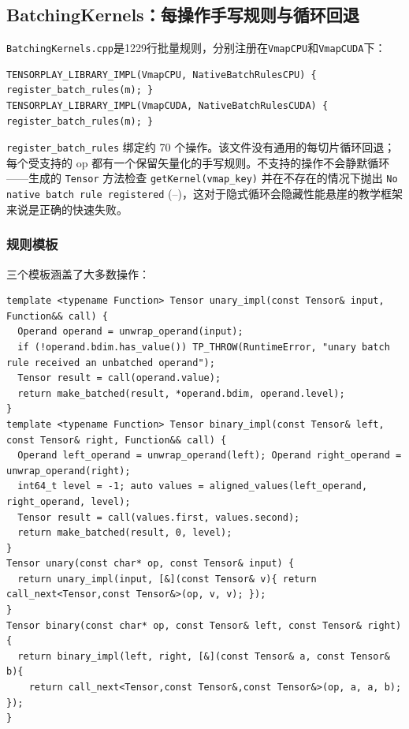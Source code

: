 \subsection{BatchingKernels：每操作手写规则与循环回退}
\label{sec:batchingkernels}

\texttt{BatchingKernels.cpp}是1229行批量规则，分别注册在\texttt{VmapCPU}和\texttt{VmapCUDA}下：

\begin{lstlisting}[caption={dual registration.}, label=lst:batchreg]
TENSORPLAY_LIBRARY_IMPL(VmapCPU, NativeBatchRulesCPU) { register_batch_rules(m); }
TENSORPLAY_LIBRARY_IMPL(VmapCUDA, NativeBatchRulesCUDA) { register_batch_rules(m); }
\end{lstlisting}

\texttt{register\_batch\_rules} 绑定约 70 个操作。该文件没有通用的每切片循环回退；每个受支持的 \ac{op} 都有一个保留矢量化的手写规则。不支持的操作不会静默循环——生成的 \texttt{Tensor} 方法检查 \texttt{getKernel(vmap\_key)} 并在不存在的情况下抛出 \texttt{No native batch rule registered} (--)，这对于隐式循环会隐藏性能悬崖的教学框架来说是正确的快速失败。

\subsubsection{规则模板}

三个模板涵盖了大多数操作：

\begin{lstlisting}[caption={unary / binary templates.}, label=lst:templates]
template <typename Function> Tensor unary_impl(const Tensor& input, Function&& call) {
  Operand operand = unwrap_operand(input);
  if (!operand.bdim.has_value()) TP_THROW(RuntimeError, "unary batch rule received an unbatched operand");
  Tensor result = call(operand.value);
  return make_batched(result, *operand.bdim, operand.level);
}
template <typename Function> Tensor binary_impl(const Tensor& left, const Tensor& right, Function&& call) {
  Operand left_operand = unwrap_operand(left); Operand right_operand = unwrap_operand(right);
  int64_t level = -1; auto values = aligned_values(left_operand, right_operand, level);
  Tensor result = call(values.first, values.second);
  return make_batched(result, 0, level);
}
Tensor unary(const char* op, const Tensor& input) {
  return unary_impl(input, [&](const Tensor& v){ return call_next<Tensor,const Tensor&>(op, v, v); });
}
Tensor binary(const char* op, const Tensor& left, const Tensor& right) {
  return binary_impl(left, right, [&](const Tensor& a, const Tensor& b){
    return call_next<Tensor,const Tensor&,const Tensor&>(op, a, a, b); });
}
\end{lstlisting}

